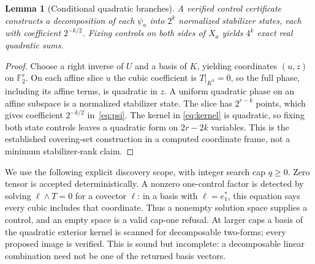 \documentclass[11pt]{article}
\newtheorem{lemma}[theorem]{Lemma}
\newcommand{\F}{\mathbb F_2}
\begin{document}
\begin{lemma}[Conditional quadratic branches]\label{lem:branches}
A verified control certificate constructs a decomposition of each $\psi_a$ into
$2^k$ normalized stabilizer states, each with coefficient $2^{-k/2}$. Fixing controls
on both sides of $X_a$ yields $4^k$ exact real quadratic sums.
\end{lemma}
\begin{proof}
Choose a right inverse of $U$ and a basis of $K$, yielding coordinates $(u,z)$ on
$\F^r$. On each affine slice $u$ the cubic coefficient is $T|_{K^3}=0$, so the full
phase, including its affine terms, is quadratic in $z$. A uniform quadratic phase on
an affine subspace is a normalized stabilizer state. The slice has $2^{r-k}$ points,
which gives coefficient $2^{-k/2}$ in~\eqref{eq:psi}. The kernel in
\eqref{eq:kernel} is quadratic, so fixing both state controls leaves a quadratic
form on $2r-2k$ variables. This is the established covering-set construction in a
computed coordinate frame, not a minimum stabilizer-rank claim.
\end{proof}

We use the following explicit discovery scope, with integer search cap $q\geq0$.
Zero tensor is accepted deterministically. A nonzero one-control factor is detected
by solving $\ell\wedge T=0$ for a covector $\ell$: in a basis with $\ell=e_1^*$,
this equation says every cubic includes that coordinate. Thus a nonempty solution
space supplies a control, and an empty space is a valid cap-one refusal. At larger
caps a basis of the quadratic exterior kernel is scanned for decomposable two-forms;
every proposed image is verified. This is sound but incomplete: a decomposable
linear combination need not be one of the returned basis vectors.
\end{document}
